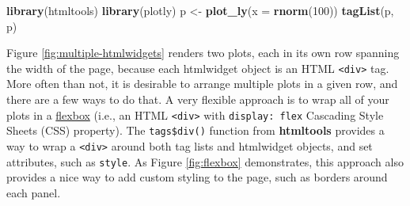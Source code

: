 \documentclass[12pt,]{isuthesis}
\newenvironment{Shaded}{\begin{snugshade}}{\end{snugshade}}
\newcommand{\KeywordTok}[1]{\textcolor[rgb]{0.13,0.29,0.53}{\textbf{{#1}}}}
\newcommand{\DataTypeTok}[1]{\textcolor[rgb]{0.13,0.29,0.53}{{#1}}}
\newcommand{\DecValTok}[1]{\textcolor[rgb]{0.00,0.00,0.81}{{#1}}}
\newcommand{\StringTok}[1]{\textcolor[rgb]{0.31,0.60,0.02}{{#1}}}
\newcommand{\NormalTok}[1]{{#1}}
\begin{document}
\begin{Shaded}
\begin{Highlighting}[]
\KeywordTok{library}\NormalTok{(htmltools)}
\KeywordTok{library}\NormalTok{(plotly)}
\NormalTok{p <-}\StringTok{ }\KeywordTok{plot_ly}\NormalTok{(}\DataTypeTok{x =} \KeywordTok{rnorm}\NormalTok{(}\DecValTok{100}\NormalTok{))}
\KeywordTok{tagList}\NormalTok{(p, p)}
\end{Highlighting}
\end{Shaded}

\hypertarget{htmlwidget-79f9f031a06c77ec49fe}{}

\hypertarget{htmlwidget-69d117be663c923b0a6e}{}

Figure \ref{fig:multiple-htmlwidgets} renders two plots, each in its own
row spanning the width of the page, because each htmlwidget object is an
HTML \texttt{\textless{}div\textgreater{}} tag. More often than not, it
is desirable to arrange multiple plots in a given row, and there are a
few ways to do that. A very flexible approach is to wrap all of your
plots in a
\href{https://css-tricks.com/snippets/css/a-guide-to-flexbox/}{flexbox}
(i.e., an HTML \texttt{\textless{}div\textgreater{}} with
\texttt{display:\ flex} Cascading Style Sheets (CSS) property). The
\texttt{tags\$div()} function from \textbf{htmltools} provides a way to
wrap a \texttt{\textless{}div\textgreater{}} around both tag lists and
htmlwidget objects, and set attributes, such as \texttt{style}. As
Figure \ref{fig:flexbox} demonstrates, this approach also provides a
nice way to add custom styling to the page, such as borders around each
panel.

\begin{Shaded}
\end{Shaded}

\hypertarget{htmlwidget-dcc3bfedaeeaca60e985}{}
\end{document}
